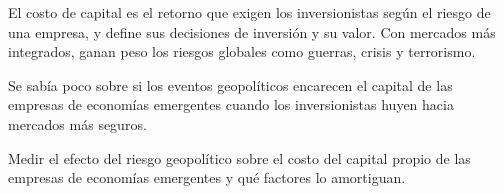\documentclass{article}
\newcommand{\bodysize}{\fontsize{28}{37.0}\selectfont}
\newcommand{\cardtitlesize}{\fontsize{33.0}{39.6}\selectfont}
\newcommand{\smallsize}{\fontsize{23.0}{29.9}\selectfont}
\newcommand{\cardtitle}[2][navy]{{\color{#1}\cardtitlesize\bfseries\textls[110]{\MakeUppercase{#2}}}\par\vspace{7mm}}
\begin{document}
\vfill
\hspace*{34mm}\begin{minipage}{773mm}
\begin{tcolorbox}[enhanced, sharp corners, colback=navy, boxrule=0pt, left=16mm, right=16mm, top=12mm, bottom=11mm,
  fontupper=\bodysize\raggedright, overlay={\fill[gold] (frame.north west) rectangle ([yshift=-5mm]frame.north east);}]
\begin{minipage}[t]{174.8mm}\raggedright{\color{acento}\smallsize\bfseries{}}\par{}\end{minipage}\hfill\begin{minipage}[t]{174.8mm}\raggedright{\color{acento}\smallsize\bfseries{}}\par{}\end{minipage}\hfill\begin{minipage}[t]{174.8mm}\raggedright{\color{acento}\smallsize\bfseries{}}\par{}\end{minipage}\hfill\begin{minipage}[t]{174.8mm}\raggedright{\color{acento}\smallsize\bfseries{}}\par{}\end{minipage}
\end{tcolorbox}
\end{minipage}

\vfill
\hspace*{34mm}\begin{minipage}{773mm}
\begin{tcbraster}[raster columns=3, raster equal height, raster column skip=16mm]
\begin{tcolorbox}[card]\cardtitle{Contexto}El costo de capital es el retorno que exigen los inversionistas según el riesgo de una empresa, y define sus decisiones de inversión y su valor. Con mercados más integrados, ganan peso los riesgos globales como guerras, crisis y terrorismo.\end{tcolorbox}
\begin{tcolorbox}[card]\cardtitle{Problema}Se sabía poco sobre si los eventos geopolíticos encarecen el capital de las empresas de economías emergentes cuando los inversionistas huyen hacia mercados más seguros.\end{tcolorbox}
\begin{tcolorbox}[card]\cardtitle{Objetivo}Medir el efecto del riesgo geopolítico sobre el costo del capital propio de las empresas de economías emergentes y qué factores lo amortiguan.\end{tcolorbox}
\end{tcbraster}
\end{minipage}
\end{document}

